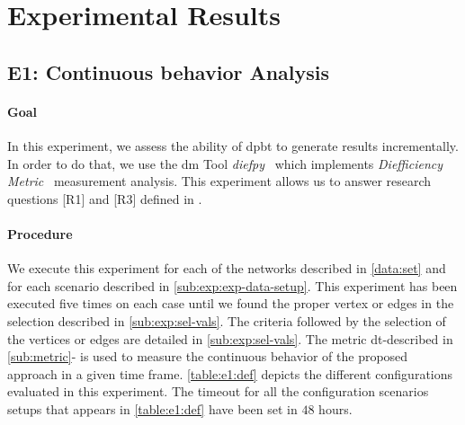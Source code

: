 \section{Experimental Results}\label{sec:exp:observed-results}
\subsection{E1: Continuous behavior Analysis}\label{sub:sec:exp-1} 
\paragraph{Goal} In this experiment, we assess the ability of \acrshort{dpbt} to generate results incrementally.
In order to do that, we use the \acrfull{dm} Tool \emph{diefpy}~\cite{diefpy} which implements \emph{Diefficiency Metric}~\cite{diefpaper} measurement analysis.
This experiment allows us to answer research questions [R1] and [R3] defined in . 

\paragraph{Procedure} We execute this experiment for each of the networks described in \autoref{data:set} and for each scenario described in \autoref{sub:exp:exp-data-setup}.
This experiment has been executed five times on each case until we found the proper vertex or edges in the selection described in \autoref{sub:exp:sel-vals}. The criteria followed by the selection of the vertices or edges are detailed in \autoref{sub:exp:sel-vals}.
The metric  \acrfull{dt}-described in \autoref{sub:metric}- is used to measure the continuous behavior of the proposed approach in a given time frame.
\autoref{table:e1:def} depicts the different configurations evaluated in this experiment. The timeout for all the configuration scenarios setups that appears in \autoref{table:e1:def} have been set in $48$ hours.

